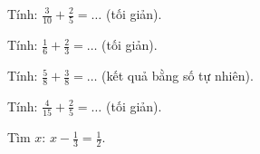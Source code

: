 \begin{ex}
Tính: $\frac{3}{10} + \frac{2}{5} = \dots$ (tối giản).
\end{ex}

\begin{ex}
Tính: $\frac{1}{6} + \frac{2}{3} = \dots$ (tối giản).
\end{ex}

\begin{ex}
Tính: $\frac{5}{8} + \frac{3}{8} = \dots$ (kết quả bằng số tự nhiên).
\end{ex}

\begin{ex}
Tính: $\frac{4}{15} + \frac{2}{5} = \dots$ (tối giản).
\end{ex}

\begin{ex}
Tìm $x$: $x - \frac{1}{3} = \frac{1}{2}$.
\end{ex}
